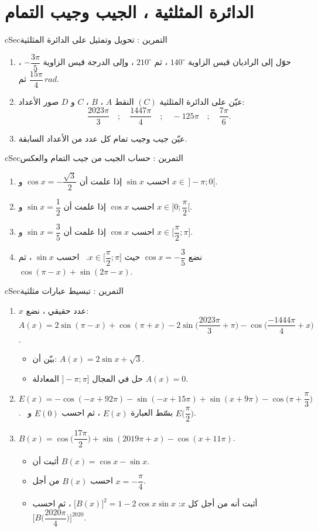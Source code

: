 \documentclass[12pt,a4paper]{article}
\newenvironment{BOX}[2]{\begin{otherlanguage}{english}\begin{arbox}{#1}{#2}}{\end{arbox}\end{otherlanguage}}
\newcounter{exo}
\newenvironment{tamrin}[1]{\stepcounter{exo}\begin{BOX}{cSec}{التمرين \theexo: #1}}{\end{BOX}}
\newenvironment{sq}{\begin{itemize}[leftmargin=2.4em,itemsep=3pt]}{\end{itemize}}
\newcommand{\qa}{\item[(أ)]}\newcommand{\qb}{\item[(ب)]}\newcommand{\qc}{\item[(جـ)]}\newcommand{\qd}{\item[(د)]}\newcommand{\qe}{\item[(هـ)]}
\begin{document}
\section{الدائرة المثلثية ، الجيب وجيب التمام}
\begin{tamrin}{تحويل وتمثيل على الدائرة المثلثية}
\begin{enumerate}
\item حوّل إلى الراديان قيس الزاوية $140^\circ$ ، ثم $210^\circ$ ، وإلى الدرجة قيس الزاوية $-\dfrac{3\pi}5$ ، ثم $\dfrac{15\pi}{4}\,rad$.
\item عيّن على الدائرة المثلثية $(C)$ النقط $A$ ، $B$ ، $C$ و $D$ صور الأعداد:
\[\frac{2023\pi}{3}\quad;\quad\frac{1447\pi}{4}\quad;\quad-125\pi\quad;\quad\frac{7\pi}6.\]
\item عيّن جيب وجيب تمام كل عدد من الأعداد السابقة.
\end{enumerate}
\end{tamrin}

\begin{tamrin}{حساب الجيب من جيب التمام والعكس}
\begin{enumerate}
\item احسب $\sin x$ إذا علمت أن $\cos x=-\dfrac{\sqrt3}2$ و $x\in\,]-\pi;0[$.
\item احسب $\cos x$ إذا علمت أن $\sin x=\dfrac12$ و $x\in\Big[0;\dfrac\pi2\Big[$.
\item احسب $\cos x$ إذا علمت أن $\sin x=\dfrac35$ و $x\in\Big[\dfrac\pi2;\pi\Big]$.
\item نضع $\cos x=-\dfrac35$ حيث $x\in\Big[\dfrac\pi2;\pi\Big]$. \ احسب $\sin x$ ، ثم $\cos(\pi-x)+\sin(2\pi-x)$.
\end{enumerate}
\end{tamrin}

\begin{tamrin}{تبسيط عبارات مثلثية}
\begin{enumerate}
\item $x$ عدد حقيقي ، نضع: $A(x)=2\sin(\pi-x)+\cos(\pi+x)-2\sin\Big(\dfrac{2023\pi}{3}+\pi\Big)-\cos\Big(\dfrac{-1444\pi}{4}+x\Big)$.
\begin{sq}
\qa بيّن أن: $A(x)=2\sin x+\sqrt3$.
\qb حل في المجال $]-\pi;\pi]$ المعادلة $A(x)=0$.
\end{sq}
\item $E(x)=-\cos(-x+92\pi)-\sin(-x+15\pi)+\sin(x+9\pi)-\cos\Big(\pi+\dfrac\pi3\Big)$. \ بسّط العبارة $E(x)$ ، ثم احسب $E(0)$ و $E\Big(\dfrac\pi2\Big)$.
\item $B(x)=\cos\Big(\dfrac{17\pi}2\Big)+\sin(2019\pi+x)-\cos(x+11\pi)$.
\begin{sq}
\qa أثبت أن $B(x)=\cos x-\sin x$.
\qb احسب $B(x)$ من أجل $x=-\dfrac\pi4$.
\qc أثبت أنه من أجل كل $x$: $\big[B(x)\big]^2=1-2\cos x\sin x$ ، ثم احسب $\Big[B\Big(\dfrac{2020\pi}{4}\Big)\Big]^{2020}$.
\end{sq}
\end{enumerate}
\end{tamrin}
\end{document}
